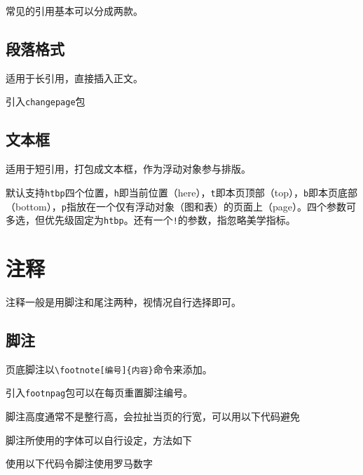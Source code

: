\documentclass[10pt,openany]{book}
\begin{document}
\begin{sloppypar}
常见的引用基本可以分成两款。

\section{段落格式}

适用于长引用，直接插入正文。

引入\texttt{changepage}包



\section{文本框}

适用于短引用，打包成文本框，作为浮动对象参与排版。



默认支持\texttt{htbp}四个位置，\texttt{h}即当前位置（here），\texttt{t}即本页顶部（top），\texttt{b}即本页底部（bottom），\texttt{p}指放在一个仅有浮动对象（图和表）的页面上（page）。四个参数可多选，但优先级固定为\texttt{htbp}。还有一个\texttt{!}的参数，指忽略美学指标。

\chapter{注释}

注释一般是用脚注和尾注两种，视情况自行选择即可。

\section{脚注}

页底脚注以\texttt{\textbackslash{}footnote{[}编号{]}\{内容\}}命令来添加。



引入\texttt{footnpag}包可以在每页重置脚注编号。



脚注高度通常不是整行高，会拉扯当页的行宽，可以用以下代码避免



脚注所使用的字体可以自行设定，方法如下



使用以下代码令脚注使用罗马数字


\end{sloppypar}
\end{document}
